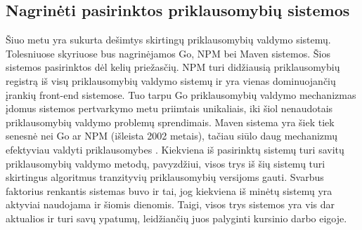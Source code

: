 \subsection{Nagrinėti pasirinktos priklausomybių sistemos}

Šiuo metu yra sukurta dešimtys skirtingų priklausomybių valdymo sistemų. Tolesniuose skyriuose bus nagrinėjamos
Go, NPM bei Maven sistemos. Šios sistemos pasirinktos dėl kelių priežasčių. NPM turi didžiausią priklausomybių
registrą iš visų priklausomybių valdymo sistemų ir yra vienas dominuojančių įrankių front-end sistemose. Tuo tarpu
Go priklausomybių valdymo mechanizmas įdomus sistemos pertvarkymo metu priimtais unikaliais, iki šiol nenaudotais
priklausomybių valdymo problemų sprendimais. Maven sistema yra šiek tiek senesnė nei Go ar NPM (išleista 2002 metais),
tačiau siūlo daug mechanizmų efektyviau valdyti priklausomybes \cite{PAD17}. Kiekviena iš pasirinktų sistemų turi savitų priklausomybių
valdymo metodų, pavyzdžiui, visos trys iš šių sistemų turi skirtingus algoritmus tranzityvių priklausomybių versijoms gauti.
Svarbus faktorius renkantis sistemas buvo ir tai, jog kiekviena iš minėtų sistemų yra aktyviai naudojama ir šiomis dienomis.
Taigi, visos trys sistemos yra vis dar aktualios ir turi savų ypatumų, leidžiančių juos palyginti kursinio darbo eigoje.


